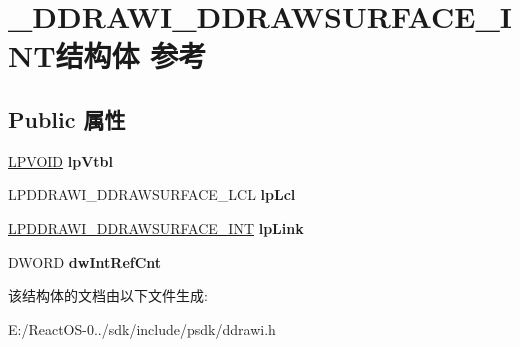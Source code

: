 \hypertarget{struct___d_d_r_a_w_i___d_d_r_a_w_s_u_r_f_a_c_e___i_n_t}{}\section{\+\_\+\+D\+D\+R\+A\+W\+I\+\_\+\+D\+D\+R\+A\+W\+S\+U\+R\+F\+A\+C\+E\+\_\+\+I\+N\+T结构体 参考}
\label{struct___d_d_r_a_w_i___d_d_r_a_w_s_u_r_f_a_c_e___i_n_t}
\subsection*{Public 属性}
\begin{DoxyCompactItemize}
\item 
\mbox{\label{struct___d_d_r_a_w_i___d_d_r_a_w_s_u_r_f_a_c_e___i_n_t_add63e29b1b60b545196eb75f2d734f90}} 
\hyperlink{interfacevoid}{L\+P\+V\+O\+ID} {\bfseries lp\+Vtbl}
\item 
\mbox{\label{struct___d_d_r_a_w_i___d_d_r_a_w_s_u_r_f_a_c_e___i_n_t_aed5bdfac207a5590e97137fcd2fa78eb}} 
L\+P\+D\+D\+R\+A\+W\+I\+\_\+\+D\+D\+R\+A\+W\+S\+U\+R\+F\+A\+C\+E\+\_\+\+L\+CL {\bfseries lp\+Lcl}
\item 
\mbox{\label{struct___d_d_r_a_w_i___d_d_r_a_w_s_u_r_f_a_c_e___i_n_t_a1c937f38e659957f0e2d793a775a3461}} 
\hyperlink{struct___d_d_r_a_w_i___d_d_r_a_w_s_u_r_f_a_c_e___i_n_t}{L\+P\+D\+D\+R\+A\+W\+I\+\_\+\+D\+D\+R\+A\+W\+S\+U\+R\+F\+A\+C\+E\+\_\+\+I\+NT} {\bfseries lp\+Link}
\item 
\mbox{\label{struct___d_d_r_a_w_i___d_d_r_a_w_s_u_r_f_a_c_e___i_n_t_a93e06b7fcd503bd5696e18ded79620fd}} 
D\+W\+O\+RD {\bfseries dw\+Int\+Ref\+Cnt}
\end{DoxyCompactItemize}


该结构体的文档由以下文件生成\+:\begin{DoxyCompactItemize}
\item 
E\+:/\+React\+O\+S-\/0../sdk/include/psdk/ddrawi.\+h\end{DoxyCompactItemize}
